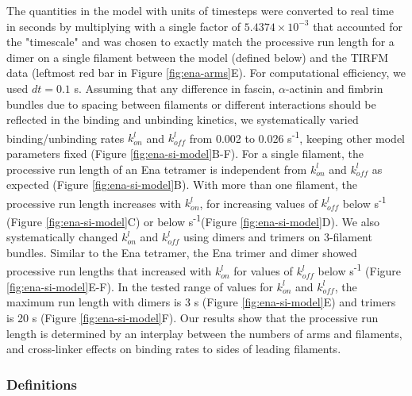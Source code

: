 The quantities in the model with units of timesteps were converted to real time in seconds by multiplying with a single factor of $5.4374 \times 10^{-3}$ that accounted for the "timescale" and was chosen to exactly match the processive run length for a dimer on a single filament between the model (defined below) and the TIRFM data (leftmost red bar in Figure \ref{fig:ena-arms}E). For computational efficiency, we used $dt = 0.1$ s.
	Assuming that any difference in fascin, $\alpha$-actinin and fimbrin bundles due to spacing between filaments or different interactions should be reflected in the binding and unbinding kinetics, we systematically varied binding/unbinding rates $k_{on}^{l}$ and $k_{off}^{l}$ from 0.002 to 0.026 s\textsuperscript{-1}, keeping other model parameters fixed (Figure \ref{fig:ena-si-model}B-F). For a single filament, the processive run length of an Ena tetramer is independent from $k_{on}^{l}$ and $k_{off}^{l}$ as expected (Figure \ref{fig:ena-si-model}B). With more than one filament, the processive run length increases with $k_{on}^{l}$, for increasing values of $k_{off}^{l}$ below  s\textsuperscript{-1} (Figure \ref{fig:ena-si-model}C) or below  s\textsuperscript{-1}(Figure \ref{fig:ena-si-model}D). We also systematically changed $k_{on}^{l}$ and $k_{off}^{l}$ using dimers and trimers on 3-filament bundles. Similar to the Ena tetramer, the Ena trimer and dimer showed processive run lengths that increased with $k_{on}^{l}$ for values of $k_{off}^{l}$ below  s\textsuperscript{-1} (Figure \ref{fig:ena-si-model}E-F). In the tested range of values for $k_{on}^{l}$ and $k_{off}^{l}$, the maximum run length with dimers is 3 s (Figure \ref{fig:ena-si-model}E) and trimers is 20 s (Figure \ref{fig:ena-si-model}F). Our results show that the processive run length is determined by an interplay between the numbers of arms and filaments, and cross-linker effects on binding rates to sides of leading filaments.
    
\subsubsection{Definitions}\label{ena-si-definitions}

